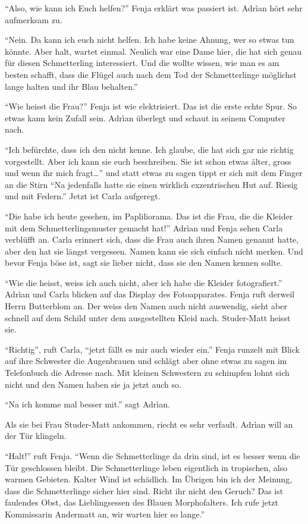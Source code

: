 \enquote{Also, wie kann ich Euch helfen?} Fenja erklärt was passiert ist. Adrìan hört sehr aufmerksam zu.

\enquote{Nein. Da kann ich euch nicht helfen. Ich habe keine Ahnung, wer so etwas tun könnte. Aber halt, wartet einmal. Neulich war eine Dame hier, die hat sich genau für diesen Schmetterling interessiert. Und die wollte wissen, wie man es am besten schafft, dass die Flügel auch nach dem Tod der Schmetterlinge möglichst lange halten und ihr Blau behalten.}

\enquote{Wie heisst die Frau?} Fenja ist wie elektrisiert. Das ist die erste echte Spur. So etwas kann kein Zufall sein. Adrìan überlegt und schaut in seinem Computer nach.

\enquote{Ich befürchte, dass ich den nicht kenne. Ich glaube, die hat sich gar nie richtig vorgestellt. Aber ich kann sie euch beschreiben. Sie ist schon etwas älter, gross und wenn ihr mich fragt\dots} und statt etwas zu sagen tippt er sich mit dem Finger an die Stirn \enquote{Na jedenfalls hatte sie einen wirklich exzentrischen Hut auf. Riesig und mit Federn.} Jetzt ist Carla aufgeregt. 

\enquote{Die habe ich heute gesehen, im Papliliorama. Das ist die Frau, die die Kleider mit dem Schmetterlingsmuster gemacht hat!} Adrìan und Fenja sehen Carla verblüfft an. Carla erinnert sich, dass die Frau auch ihren Namen genannt hatte, aber den hat sie längst vergessen. Namen kann sie sich einfach nicht merken. Und bevor Fenja böse ist, sagt sie lieber nicht, dass sie den Namen kennen sollte.

\enquote{Wie die heisst, weiss ich auch nicht, aber ich habe die Kleider fotografiert.} Adrìan und Carla blicken auf das Display des Fotoapparates. Fenja ruft derweil Herrn Butterblom an. Der weiss den Namen auch nicht auswendig, sieht aber schnell auf dem Schild unter dem ausgestellten Kleid nach. Studer-Matt heisst sie.

\enquote{Richtig}, ruft Carla, \enquote{jetzt fällt es mir auch wieder ein.} Fenja runzelt mit Blick auf ihre Schwester die Augenbrauen und schlägt aber ohne etwas zu sagen im Telefonbuch die Adresse nach. Mit kleinen Schwestern zu schimpfen lohnt sich nicht und den Namen haben sie ja jetzt auch so.

\enquote{Na ich komme mal besser mit.} sagt Adrìan.

Als sie bei Frau Studer-Matt ankommen, riecht es sehr verfault. Adrìan will an der Tür klingeln.

\enquote{Halt!} ruft Fenja. \enquote{Wenn die Schmetterlinge da drin sind, ist es besser wenn die Tür geschlossen bleibt. Die Schmetterlinge leben eigentlich in tropischen, also warmen Gebieten. Kalter Wind ist schädlich. Im Übrigen bin ich der Meinung, dass die Schmetterlinge sicher hier sind. Richt ihr nicht den Geruch? Das ist faulendes Obst, das Lieblingsessen des Blauen Morphofalters. Ich rufe jetzt Kommissarin Andermatt an, wir warten hier so lange.}


